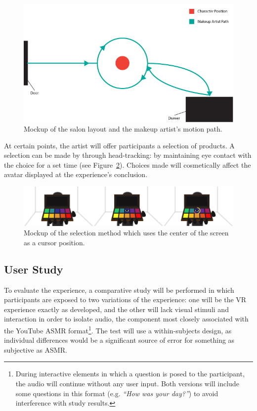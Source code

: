 \documentclass{sigchi}
\newcommand{\inlinequote}[1]{\textit{``#1''}}
\begin{document}
\begin{figure}[htb]
\centering
  \includegraphics[width=0.9\columnwidth]{figures/layout}
  \caption{Mockup of the salon layout and the makeup artist's motion path.}
  \label{fig:layout}
\end{figure}

At certain points, the artist will offer participants a selection of products. A selection can be made by through head-tracking: by maintaining eye contact with the choice for a set time (see
Figure~\ref{fig:selection}). Choices made will cosmetically affect the avatar displayed at the experience's conclusion.

\begin{figure}[htb]
\centering
  \includegraphics[width=0.9\columnwidth]{figures/selection}
  \caption{Mockup of the selection method which uses the center of the screen as a cursor position.}
  \label{fig:selection}
\end{figure}

\subsection{User Study}

To evaluate the experience, a comparative study will be performed in which participants are exposed to two variations of the experience: one will be the VR experience exactly as developed, and the other will lack visual stimuli and interaction in order to isolate audio, the component most closely associated with the YouTube ASMR format\footnote{During interactive elements in which a question is posed to the participant, the audio will continue without any user input. Both versions will include some questions in this format (e.g. \inlinequote{How was your day?}) to avoid interference with study results.}. The test will use a within-subjects design, as individual differences would be a significant source of error for something as subjective as ASMR.
\end{document}
